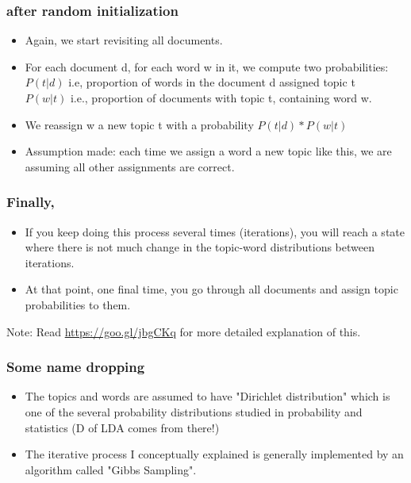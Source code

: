 \documentclass{beamer}
\begin{document}
\begin{frame}
\frametitle{after random initialization}
\begin{itemize}
\item Again, we start revisiting all documents. 
\item For each document d, for each word w in it, we compute two probabilities:
\\ $P(t|d)$ i.e, proportion of words in the document d assigned topic t
\\ $P(w|t)$ i.e., proportion of documents with topic t, containing word w. \pause
\item We reassign w a new topic t with a probability $P(t|d)*P(w|t)$
\item Assumption made: each time we assign a word a new topic like this, we are assuming all other assignments are correct. \pause
\end{itemize}
\end{frame}

\begin{frame}
\frametitle{Finally,}
\begin{itemize}
\item If you keep doing this process several times (iterations), you will reach a state where there is not much change in the topic-word distributions between iterations.
\item At that point, one final time, you go through all documents and assign topic probabilities to them. 
\end{itemize}
Note: Read \url{https://goo.gl/jbgCKq} for more detailed explanation of this. 
\end{frame}

\begin{frame}
\frametitle{Some name dropping}
\begin{itemize}
\item The topics and words are assumed to have "Dirichlet distribution" which is one of the several probability distributions studied in probability and statistics (D of LDA comes from there!)
\item The iterative process I conceptually explained is generally implemented by an algorithm called "Gibbs Sampling".
\end{itemize}
\end{frame}
\end{document}
